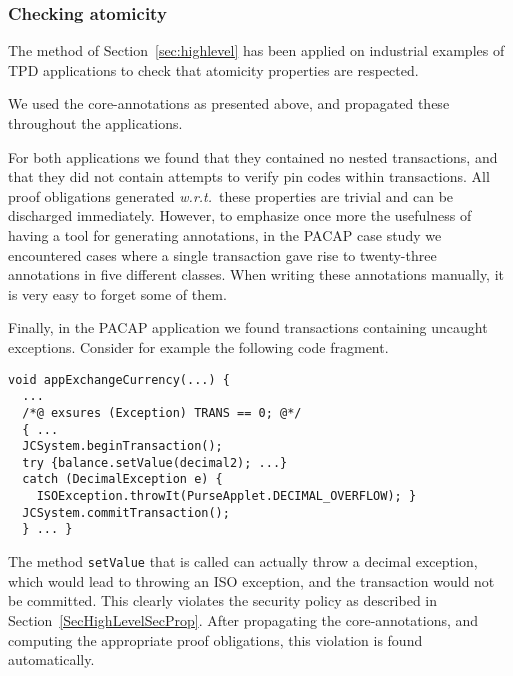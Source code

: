 \subsubsection{Checking atomicity}
The method of Section~\ref{sec:highlevel} has been applied on
industrial examples of TPD applications to check that atomicity
properties are respected.



 We used the core-annotations as presented above, and
propagated these throughout the applications.

For both applications we found that they contained no nested
transactions, and that they did not contain attempts to verify pin
codes within transactions. All proof obligations generated
\emph{w.r.t.}~these properties are trivial and can be discharged
immediately. However, to emphasize once more the usefulness of having
a tool for generating annotations, in the PACAP case study we
encountered cases where a single transaction gave rise to twenty-three
annotations in five different classes. When writing these annotations
manually, it is very easy to forget some of them.

Finally, in the PACAP application we found transactions containing
uncaught exceptions. Consider for example the following code fragment.
\begin{verbatim}
void appExchangeCurrency(...) { 
  ...
  /*@ exsures (Exception) TRANS == 0; @*/ 
  { ...
  JCSystem.beginTransaction();      
  try {balance.setValue(decimal2); ...}
  catch (DecimalException e) {
    ISOException.throwIt(PurseApplet.DECIMAL_OVERFLOW); }
  JCSystem.commitTransaction();
  } ... }
\end{verbatim}
The method \texttt{setValue} that is called can actually throw a
decimal exception, which would lead to throwing an ISO exception, and
the transaction would not be committed. This clearly violates the
security policy as described in
Section~\ref{SecHighLevelSecProp}. After propagating the
core-annotations, and computing the appropriate proof obligations,
this violation is found automatically.




